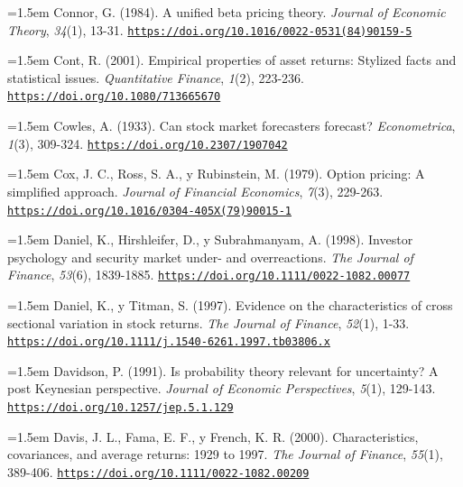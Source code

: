 \documentclass[10pt,a4paper]{article}
\begin{document}
\noindent\hangindent=1.5em Connor, G. (1984). A unified beta pricing theory. \textit{Journal of Economic Theory}, \textit{34}(1), 13-31. \href{https://doi.org/10.1016/0022-0531(84)90159-5}{\nolinkurl{https://doi.org/10.1016/0022-0531(84)90159-5}}

\noindent\hangindent=1.5em Cont, R. (2001). Empirical properties of asset returns: Stylized facts and statistical issues. \textit{Quantitative Finance}, \textit{1}(2), 223-236. \href{https://doi.org/10.1080/713665670}{\nolinkurl{https://doi.org/10.1080/713665670}}

\noindent\hangindent=1.5em Cowles, A. (1933). Can stock market forecasters forecast? \textit{Econometrica}, \textit{1}(3), 309-324. \href{https://doi.org/10.2307/1907042}{\nolinkurl{https://doi.org/10.2307/1907042}}

\noindent\hangindent=1.5em Cox, J. C., Ross, S. A., y Rubinstein, M. (1979). Option pricing: A simplified approach. \textit{Journal of Financial Economics}, \textit{7}(3), 229-263. \href{https://doi.org/10.1016/0304-405X(79)90015-1}{\nolinkurl{https://doi.org/10.1016/0304-405X(79)90015-1}}

\noindent\hangindent=1.5em Daniel, K., Hirshleifer, D., y Subrahmanyam, A. (1998). Investor psychology and security market under- and overreactions. \textit{The Journal of Finance}, \textit{53}(6), 1839-1885. \href{https://doi.org/10.1111/0022-1082.00077}{\nolinkurl{https://doi.org/10.1111/0022-1082.00077}}

\noindent\hangindent=1.5em Daniel, K., y Titman, S. (1997). Evidence on the characteristics of cross sectional variation in stock returns. \textit{The Journal of Finance}, \textit{52}(1), 1-33. \href{https://doi.org/10.1111/j.1540-6261.1997.tb03806.x}{\nolinkurl{https://doi.org/10.1111/j.1540-6261.1997.tb03806.x}}

\noindent\hangindent=1.5em Davidson, P. (1991). Is probability theory relevant for uncertainty? A post Keynesian perspective. \textit{Journal of Economic Perspectives}, \textit{5}(1), 129-143. \href{https://doi.org/10.1257/jep.5.1.129}{\nolinkurl{https://doi.org/10.1257/jep.5.1.129}}

\noindent\hangindent=1.5em Davis, J. L., Fama, E. F., y French, K. R. (2000). Characteristics, covariances, and average returns: 1929 to 1997. \textit{The Journal of Finance}, \textit{55}(1), 389-406. \href{https://doi.org/10.1111/0022-1082.00209}{\nolinkurl{https://doi.org/10.1111/0022-1082.00209}}
\end{document}
